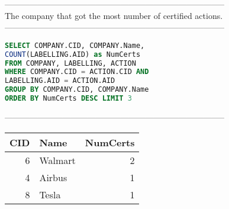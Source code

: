 --------------------------------------------------------------------------------
\\The company that got the most number of certified actions.\\
--------------------------------------------------------------------------------
\begin{lstlisting}[language = SQL]
SELECT COMPANY.CID, COMPANY.Name, 
COUNT(LABELLING.AID) as NumCerts 
FROM COMPANY, LABELLING, ACTION
WHERE COMPANY.CID = ACTION.CID AND
LABELLING.AID = ACTION.AID 
GROUP BY COMPANY.CID, COMPANY.Name
ORDER BY NumCerts DESC LIMIT 3
\end{lstlisting}
--------------------------------------------------------------------------------
\\\begin{tabular}{rlr}
\toprule
   CID & Name    &   NumCerts \\
\midrule
     6 & Walmart &          2 \\
     4 & Airbus  &          1 \\
     8 & Tesla   &          1 \\
\bottomrule
\end{tabular}